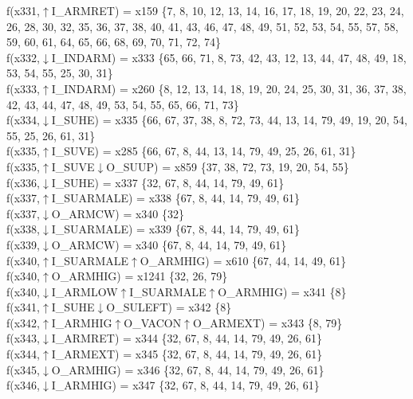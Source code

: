 f(x331,$\uparrow$I\_ARMRET) = x159 \{7, 8, 10, 12, 13, 14, 16, 17, 18, 19, 20, 22, 23, 24, 26, 28, 30, 32, 35, 36, 37, 38, 40, 41, 43, 46, 47, 48, 49, 51, 52, 53, 54, 55, 57, 58, 59, 60, 61, 64, 65, 66, 68, 69, 70, 71, 72, 74\} \\  
f(x332,$\downarrow$I\_INDARM) = x333 \{65, 66, 71, 8, 73, 42, 43, 12, 13, 44, 47, 48, 49, 18, 53, 54, 55, 25, 30, 31\} \\  
f(x333,$\uparrow$I\_INDARM) = x260 \{8, 12, 13, 14, 18, 19, 20, 24, 25, 30, 31, 36, 37, 38, 42, 43, 44, 47, 48, 49, 53, 54, 55, 65, 66, 71, 73\} \\  
f(x334,$\downarrow$I\_SUHE) = x335 \{66, 67, 37, 38, 8, 72, 73, 44, 13, 14, 79, 49, 19, 20, 54, 55, 25, 26, 61, 31\} \\  
f(x335,$\uparrow$I\_SUVE) = x285 \{66, 67, 8, 44, 13, 14, 79, 49, 25, 26, 61, 31\} \\  
f(x335,$\uparrow$I\_SUVE$\downarrow$O\_SUUP) = x859 \{37, 38, 72, 73, 19, 20, 54, 55\} \\  
f(x336,$\downarrow$I\_SUHE) = x337 \{32, 67, 8, 44, 14, 79, 49, 61\} \\  
f(x337,$\uparrow$I\_SUARMALE) = x338 \{67, 8, 44, 14, 79, 49, 61\} \\  
f(x337,$\downarrow$O\_ARMCW) = x340 \{32\} \\  
f(x338,$\downarrow$I\_SUARMALE) = x339 \{67, 8, 44, 14, 79, 49, 61\} \\  
f(x339,$\downarrow$O\_ARMCW) = x340 \{67, 8, 44, 14, 79, 49, 61\} \\  
f(x340,$\uparrow$I\_SUARMALE$\uparrow$O\_ARMHIG) = x610 \{67, 44, 14, 49, 61\} \\  
f(x340,$\uparrow$O\_ARMHIG) = x1241 \{32, 26, 79\} \\  
f(x340,$\downarrow$I\_ARMLOW$\uparrow$I\_SUARMALE$\uparrow$O\_ARMHIG) = x341 \{8\} \\  
f(x341,$\uparrow$I\_SUHE$\downarrow$O\_SULEFT) = x342 \{8\} \\  
f(x342,$\uparrow$I\_ARMHIG$\uparrow$O\_VACON$\uparrow$O\_ARMEXT) = x343 \{8, 79\} \\  
f(x343,$\downarrow$I\_ARMRET) = x344 \{32, 67, 8, 44, 14, 79, 49, 26, 61\} \\  
f(x344,$\uparrow$I\_ARMEXT) = x345 \{32, 67, 8, 44, 14, 79, 49, 26, 61\} \\  
f(x345,$\downarrow$O\_ARMHIG) = x346 \{32, 67, 8, 44, 14, 79, 49, 26, 61\} \\  
f(x346,$\downarrow$I\_ARMHIG) = x347 \{32, 67, 8, 44, 14, 79, 49, 26, 61\} \\  
